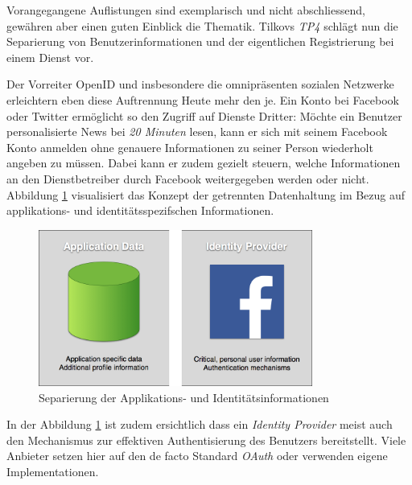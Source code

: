 Vorangegangene Auflistungen sind exemplarisch und nicht abschliessend, gewähren aber einen guten Einblick die Thematik.
\newline\newline
Tilkovs \emph{TP4} schlägt nun die Separierung von Benutzerinformationen und der eigentlichen Registrierung bei einem Dienst vor.

Der Vorreiter OpenID \cite{OpenID} und insbesondere die omnipräsenten sozialen Netzwerke erleichtern eben diese Auftrennung Heute mehr den je.
\newline\newline
Ein Konto bei Facebook oder Twitter ermöglicht so den Zugriff auf Dienste Dritter: Möchte ein Benutzer personalisierte News bei \emph{20 Minuten} lesen, kann er sich mit seinem Facebook Konto anmelden \cite{20min} ohne genauere Informationen zu seiner Person wiederholt angeben zu müssen. Dabei kann er zudem gezielt steuern, welche Informationen an den Dienstbetreiber durch Facebook weitergegeben werden oder nicht.
\newline\newline
Abbildung \ref{fig:applicationdata-vs-identityprovider} visualisiert das Konzept der getrennten Datenhaltung im Bezug auf applikations- und identitätsspezifschen Informationen.

\begin{figure}[H]
	\centering
	\includegraphics[width=9cm]{content/principle-demonstration/images/applicationdata-vs-identityprovider.png}
	\caption{Separierung der Applikations- und Identitätsinformationen}
	\label{fig:applicationdata-vs-identityprovider}
\end{figure}

In der Abbildung \ref{fig:applicationdata-vs-identityprovider} ist zudem ersichtlich dass ein \emph{Identity Provider} meist auch den Mechanismus zur effektiven Authentisierung des Benutzers bereitstellt. Viele Anbieter setzen hier auf den de facto Standard \emph{OAuth} \cite{oauth} oder verwenden eigene Implementationen.


